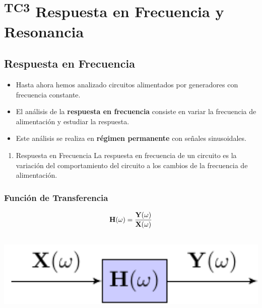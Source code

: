 \chapter{\textsuperscript{TC3} Respuesta en Frecuencia y Resonancia}\label{chap:respuesta_frecuencia}

\section{Respuesta en Frecuencia}


\begin{itemize}
\item Hasta ahora hemos analizado circuitos alimentados por generadores con frecuencia constante.
\item El análisis de la \textbf{respuesta en frecuencia} consiste en variar la frecuencia de alimentación y estudiar la respuesta.
\item Este análisis se realiza en \textbf{régimen permanente} con señales sinusoidales.
\end{itemize}

\begin{enumerate}
\item Respuesta en Frecuencia
\label{sec:org4955c1c}
La respuesta en frecuencia de un circuito es la variación del comportamiento del circuito a los cambios de la frecuencia de alimentación.
\end{enumerate}


\subsection{Función de Transferencia}

\[
  \mathbf{H}(\omega) = \frac{\mathbf{Y}(\omega)}{\mathbf{X}(\omega)}
\]
\begin{center}
\includegraphics[height=4cm]{../figs/TransferFunction.pdf}
\end{center}


